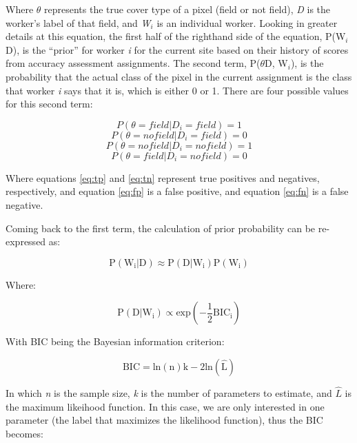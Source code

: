 \documentclass[
  11pt,
  a4paper]{article}
\begin{document}
Where \(\theta\) represents the true cover type of a pixel (field or not
field), \emph{D} is the worker's label of that field, and \emph{W\(_i\)}
is an individual worker. Looking in greater details at this equation,
the first half of the righthand side of the equation,
P(W\(_i\)\textbar D), is the ``prior'' for worker \emph{i} for the
current site based on their history of scores from accuracy assessment
assignments. The second term, P(\(\theta\)\textbar D, W\(_i\)), is the
probability that the actual class of the pixel in the current assignment
is the class that worker \emph{i} says that it is, which is either 0 or
1. There are four possible values for this second term:

\begin{equation} \label{eq:tp}
P(\theta = field|D_i = field) = 1
\end{equation} \begin{equation} \label{eq:fp}
P(\theta = no field|D_i = field) = 0
\end{equation} \begin{equation} \label{eq:tn}
P(\theta = no field|D_i = no field) = 1
\end{equation} \begin{equation} \label{eq:fn}
P(\theta = field|D_i = no field) = 0
\end{equation}

Where equations \ref{eq:tp} and \ref{eq:tn} represent true positives and
negatives, respectively, and equation \ref{eq:fp} is a false positive,
and equation \ref{eq:fn} is a false negative.

Coming back to the first term, the calculation of prior probability can
be re-expressed as:

\begin{equation} \label{eq:prior}
\mathrm{P(W_i|D) \approx P(D|W_i)P(W_i)}
\end{equation}

Where:

\begin{equation} 
\mathrm{P(D|W_i) \propto exp\left(-\frac{1}{2}BIC_i\right)}
\end{equation}

With BIC being the Bayesian information criterion:

\begin{equation}
\mathrm{BIC = ln(n)k - 2ln(\hat{L})}
\end{equation}

In which \emph{n} is the sample size, \emph{k} is the number of
parameters to estimate, and \(\hat{L}\) is the maximum likeihood
function. In this case, we are only interested in one parameter (the
label that maximizes the likelihood function), thus the BIC becomes:
\end{document}
